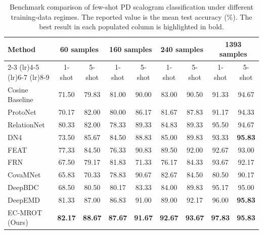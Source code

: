 \documentclass[journal]{IEEEtran}
\newcommand{\method}{EC-MROT}
\newcommand{\1}{\mathbf{1}}
\begin{document}
\begin{table}[!t]
\centering
\caption{Benchmark comparison of few-shot PD scalogram classification under different training-data regimes. The reported value is the mean test accuracy (\%). The best result in each populated column is highlighted in bold.}
\vspace{-2pt}
\label{tab:benchmark_pd_scalogram_fewshot}
\small
\renewcommand{\arraystretch}{1.12}
\setlength{\tabcolsep}{0pt}
\begin{tabular*}{\textwidth}{@{\extracolsep{\fill}}lcccccccc@{}}
\toprule
\multirow{2}{*}{Method}
& \multicolumn{2}{c}{60 samples}
& \multicolumn{2}{c}{160 samples}
& \multicolumn{2}{c}{240 samples}
& \multicolumn{2}{c}{1393 samples} \\
\cmidrule(lr){2-3}
\cmidrule(lr){4-5}
\cmidrule(lr){6-7}
\cmidrule(lr){8-9}
& 1-shot & 5-shot
& 1-shot & 5-shot
& 1-shot & 5-shot
& 1-shot & 5-shot \\
\midrule
Cosine Baseline~\cite{chen2019closer} & 71.50 & 79.83 & 81.00 & 90.00 & 83.00 & 90.50 & 91.33 & 94.67 \\
ProtoNet~\cite{snell2017prototypical} & 70.17 & 82.00 & 80.00 & 86.17 & 81.67 & 87.83 & 91.17 & 94.33 \\
RelationNet~\cite{sung2018relation} & 80.33 & 82.00 & 78.33 & 89.33 & 84.83 & 89.33 & 95.50 & 94.67 \\
DN4~\cite{li2019dn4} & 73.50 & 85.67 & 84.50 & 88.83 & 85.00 & 89.83 & 93.33 & \textbf{95.83} \\
FEAT~\cite{ye2020few} & 77.33 & 84.50 & 76.33 & 90.83 & 89.50 & 92.00 & 92.67 & 93.00 \\
FRN~\cite{wertheimer2021frn} & 67.50 & 79.17 & 81.83 & 71.33 & 76.17 & 84.33 & 93.67 & 92.17 \\
CovaMNet~\cite{li2019covariance} & 65.83 & 70.33 & 78.83 & 90.67 & 82.67 & 84.50 & 80.50 & 90.17 \\
DeepBDC~\cite{xie2022deepbdc} & 68.50 & 80.50 & 80.17 & 83.33 & 84.00 & 89.83 & 95.17 & 95.00 \\
DeepEMD~\cite{zhang2020deepemd} & 81.33 & 87.00 & 86.83 & 91.00 & 89.00 & 92.17 & 96.00 & \textbf{95.83} \\
\method{} (Ours) & \textbf{82.17} & \textbf{88.67} & \textbf{87.67} & \textbf{91.67} & \textbf{92.67} & \textbf{93.67} & \textbf{97.83} & \textbf{95.83} \\
\bottomrule
\end{tabular*}
\end{table}

\clearpage
\end{document}
